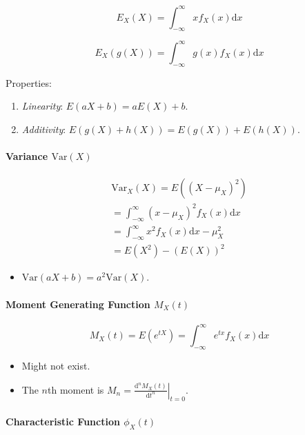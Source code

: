 \documentclass[twocolumn,english]{article}
\begin{document}
\[
E_{X}\left(X\right)=\int_{-\infty}^{\infty}xf_{X}\left(x\right)\text{d}x
\]

\[
E_{X}\left(g\left(X\right)\right)=\int_{-\infty}^{\infty}g\left(x\right)f_{X}\left(x\right)\text{d}x
\]

Properties:
\begin{enumerate}
\item \emph{Linearity}: $E\left(aX+b\right)=aE\left(X\right)+b$.
\item \emph{Additivity}: $E\left(g\left(X\right)+h\left(X\right)\right)=E\left(g\left(X\right)\right)+E\left(h\left(X\right)\right)$.
\end{enumerate}

\paragraph{Variance $\text{Var}\left(X\right)$}

\begin{multline*}
\text{Var}_{X}\left(X\right)=E\left(\left(X-\mu_{X}\right)^{2}\right)\\
=\int_{-\infty}^{\infty}\left(x-\mu_{X}\right)^{2}f_{X}\left(x\right)\text{d}x\\
=\int_{-\infty}^{\infty}x^{2}f_{X}\left(x\right)\text{d}x-\mu_{X}^{2}\\
=E\left(X^{2}\right)-\left(E\left(X\right)\right)^{2}
\end{multline*}
\begin{itemize}
\item $\text{Var}\left(aX+b\right)=a^{2}\text{Var}\left(X\right)$.
\end{itemize}

\paragraph{Moment Generating Function $M_{X}\left(t\right)$}

\[
M_{X}\left(t\right)=E\left(e^{tX}\right)=\int_{-\infty}^{\infty}e^{tx}f_{X}\left(x\right)\text{d}x
\]
\begin{itemize}
\item Might not exist.
\item The $n$th moment is $\left.M_{n}=\frac{\text{d}^{n}M_{X}\left(t\right)}{\text{d}t^{n}}\right\vert _{t=0}$.
\end{itemize}

\paragraph{Characteristic Function $\phi_{X}\left(t\right)$}
\end{document}
